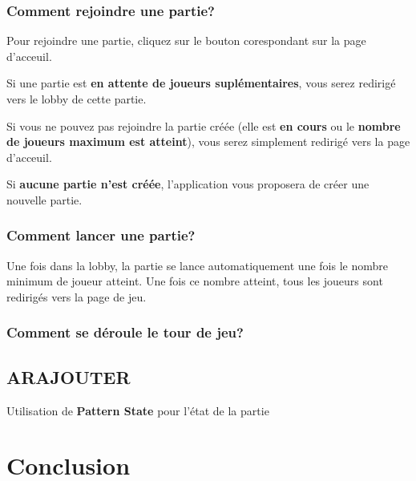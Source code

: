 \documentclass[11pt]{scrreprt}
\begin{document}
    \subsection{Comment rejoindre une partie?}
    Pour rejoindre une partie, cliquez sur le bouton corespondant sur la page d'acceuil.

    Si une partie est \textbf{en attente de joueurs suplémentaires}, vous serez redirigé vers le lobby de cette partie.

    Si vous ne pouvez pas rejoindre la partie créée (elle est \textbf{en cours} ou le \textbf{nombre de joueurs maximum est atteint}), vous serez simplement redirigé vers la page d'acceuil.

    Si \textbf{aucune partie n'est créée}, l'application vous proposera de créer une nouvelle partie.

    \subsection{Comment lancer une partie?}
    Une fois dans la lobby, la partie se lance automatiquement une fois le nombre minimum de joueur atteint. Une fois ce nombre atteint, tous les joueurs sont redirigés vers la page de jeu.

    \subsection{Comment se déroule le tour de jeu?}

    \section{ARAJOUTER}
    Utilisation de \textbf{Pattern State} pour l'état de la partie

    \chapter{Conclusion}
\end{document}
